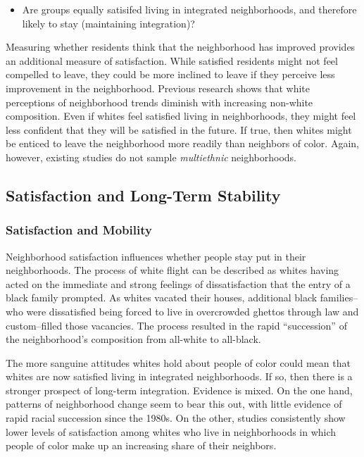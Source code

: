 \documentclass{baderart}
\providecommand{\tightlist}{%
  \setlength{\itemsep}{0pt}\setlength{\parskip}{0pt}}
\begin{document}
\begin{itemize}
\tightlist
\item
  Are groups equally satisifed living in integrated neighborhoods, and
  therefore likely to stay (maintaining integration)?
\end{itemize}

Measuring whether residents think that the neighborhood has improved
provides an additional measure of satisfaction. While satisfied
residents might not feel compelled to leave, they could be more inclined
to leave if they perceive less improvement in the neighborhood. Previous
research shows that white perceptions of neighborhood trends diminish
with increasing non-white composition. Even if whites feel satisfied
living in neighborhoods, they might feel less confident that they will
be satisfied in the future. If true, then whites might be enticed to
leave the neighborhood more readily than neighbors of color. Again,
however, existing studies do not sample \emph{multiethnic}
neighborhoods.

\subsection{Satisfaction and Long-Term Stability}\label{satisfaction-and-long-term-stability}

\subsubsection{Satisfaction and Mobility}\label{satisfaction-and-mobility}

Neighborhood satisfaction influences whether people stay put in their neighborhoods. The process of white flight can be described as whites having acted on the immediate and strong feelings of dissatisfaction that the entry of a black family prompted. As whites vacated their houses, additional black families--who were dissatisfied being forced to live in overcrowded ghettos through law and custom--filled those vacancies. The process resulted in the rapid ``succession'' of the neighborhood's composition from all-white to all-black.

The more sanguine attitudes whites hold about people of color could mean that whites are now satisfied living in integrated neighborhoods. If so, then there is a stronger prospect of long-term integration. Evidence is mixed. On the one hand, patterns of neighborhood change seem to bear this out, with little evidence of rapid racial succession since the 1980s. On the other, studies consistently show lower levels of satisfaction among whites who live in neighborhoods in which people of color make up an increasing share of their neighbors.
\end{document}
